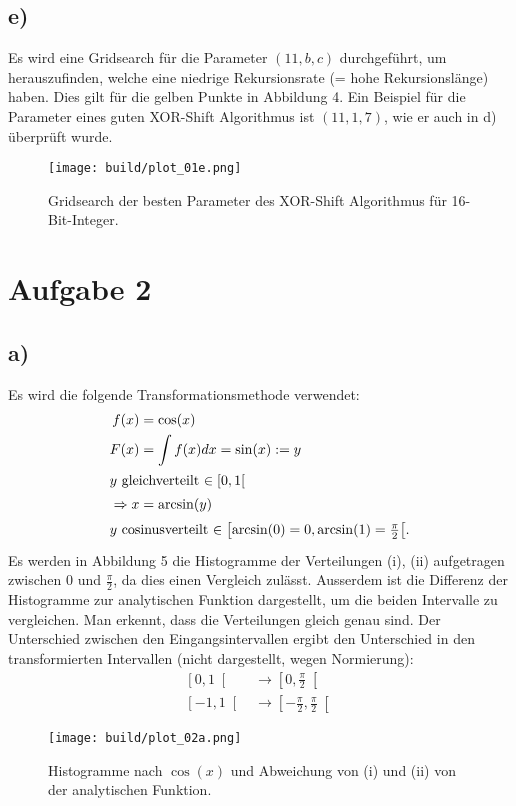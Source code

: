 \documentclass{scrartcl}
\begin{document}
\subsection*{e)}
Es wird eine Gridsearch für die Parameter $(11, b, c)$ durchgeführt, um herauszufinden, welche eine niedrige Rekursionsrate (= hohe Rekursionslänge) haben.
Dies gilt für die gelben Punkte in Abbildung 4.
Ein Beispiel für die Parameter eines guten XOR-Shift Algorithmus ist $(11, 1, 7)$, wie er auch in d) überprüft wurde.
\begin{figure}[ht]
  \centering
  \texttt{[image: build/plot\_01e.png]}
  \caption{Gridsearch der besten Parameter des XOR-Shift Algorithmus für 16-Bit-Integer.}%
  \label{fig:4}
\end{figure}

\section*{Aufgabe 2}
\subsection*{a)}
Es wird die folgende Transformationsmethode verwendet:
\begin{align*}
  f(x) &= \cos(x) \\
  F(x) &= \int f(x)dx = \sin(x) := y \\
  \intertext{$y$ gleichverteilt $\in \left[0, 1\right[$}
  \Rightarrow x &= \arcsin(y) \\
  \intertext{$y$ cosinusverteilt $\in \left[\arcsin(0) = 0, \arcsin(1) = \frac{\pi}{2}\right[$.}
\end{align*}
Es werden in Abbildung 5 die Histogramme der Verteilungen (i), (ii) aufgetragen zwischen 0 und $\frac{\pi}{2}$,
da dies einen Vergleich zulässt.
Ausserdem ist die Differenz der Histogramme zur analytischen Funktion dargestellt, um die beiden Intervalle zu vergleichen.
Man erkennt, dass die Verteilungen gleich genau sind.
Der Unterschied zwischen den Eingangsintervallen ergibt den Unterschied in den transformierten Intervallen (nicht dargestellt, wegen Normierung):
\begin{align*}
  \left[0, 1\right[ &\rightarrow \left[0, \frac{\pi}{2}\right[ \\
  \left[-1, 1\right[ &\rightarrow \left[-\frac{\pi}{2}, \frac{\pi}{2}\right[
\end{align*}
\begin{figure}[ht]
  \centering
  \texttt{[image: build/plot\_02a.png]}
  \caption{Histogramme nach $\cos(x)$ und Abweichung von (i) und (ii) von der analytischen Funktion.}%
  \label{fig:5}
\end{figure}
\end{document}
